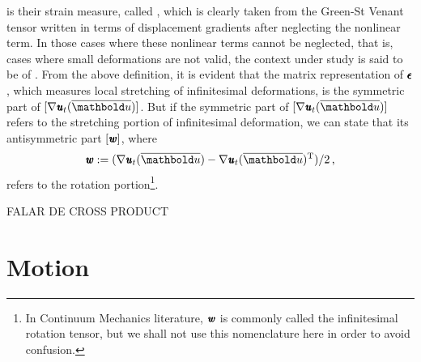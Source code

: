 is their strain measure, called , which is clearly taken from the Green-St Venant tensor written in terms of displacement gradients after neglecting the nonlinear term.
In those cases where these nonlinear terms cannot be neglected, that is, cases where small deformations are not valid, the context under study is said to be of . From the above definition, it is evident that the matrix representation of $\pmb{\epsilon}$, which measures local stretching of infinitesimal deformations, is the symmetric part of $[\fua{\nabla\tnr{\mathit{u}}_t}{\overline{\vto{u}}}]$. But if the symmetric part of $[\fua{\nabla\tnr{\mathit{u}}_t}{\overline{\vto{u}}}]$ refers to the stretching portion of infinitesimal deformation, we can state that its antisymmetric part $[\pmb{\mathit{w}}]$, where
\begin{equation}\label{eq:infinitRotation}
\tnr{\mathit{w}}:=(\fua{\nabla\tnr{\mathit{u}}_t}{\overline{\vto{u}}}-\fua{\nabla\tnr{\mathit{u}}_t}{\overline{\vto{u}}}^{\text{T}})/2\,,
\end{equation}
refers to the rotation portion\footnote{In Continuum Mechanics literature, $\pmb{\mathit{w}}$ is commonly called the infinitesimal rotation tensor, but we shall not use this nomenclature here in order to avoid confusion.}. 

FALAR DE CROSS PRODUCT


\section{Motion}

